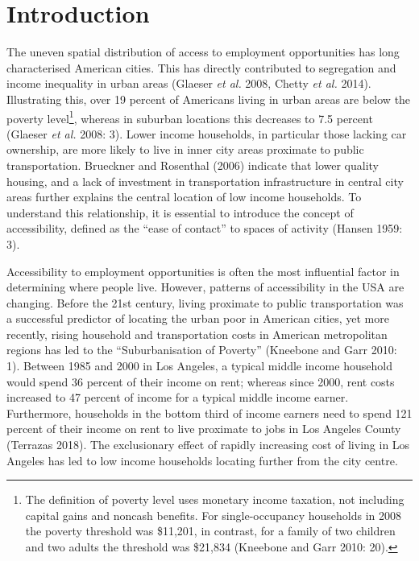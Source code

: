 \documentclass[a4paper,UKenglish]{lipics-v2018}
\begin{document}
\section{Introduction}
\doublespacing 
\normalsize
The uneven spatial distribution of access to employment opportunities has long characterised American cities. This has directly contributed to segregation and income inequality in urban areas (Glaeser \textit{et al.} 2008, Chetty \textit{et al.} 2014). Illustrating this, over 19 percent of Americans living in urban areas are below the poverty level\footnote{The definition of poverty level uses monetary income taxation, not including capital gains and noncash benefits. For single-occupancy households in 2008 the poverty threshold was \$11,201, in contrast, for a family of two children and two adults the threshold was \$21,834 (Kneebone and Garr 2010: 20).}, whereas in suburban locations this decreases to 7.5 percent (Glaeser \textit{et al.} 2008: 3). Lower income households, in particular those lacking car ownership, are more likely to live in inner city areas proximate to public transportation. Brueckner and Rosenthal (2006) indicate that lower quality housing, and a lack of investment in transportation infrastructure in central city areas further explains the central location of low income households. To understand this relationship, it is essential to introduce the concept of accessibility, defined as the “ease of contact” to spaces of activity (Hansen 1959: 3).

Accessibility to employment opportunities is often the most influential factor in determining where people live. However, patterns of accessibility in the USA are changing. Before the 21st century, living proximate to public transportation was a successful predictor of locating the urban poor in American cities, yet more recently, rising household and transportation costs in American metropolitan regions has led to the “Suburbanisation of Poverty” (Kneebone and Garr 2010: 1). Between 1985 and 2000 in Los Angeles, a typical middle income household would spend 36 percent of their income on rent; whereas since 2000, rent costs increased to 47 percent of income for a typical middle income earner. Furthermore, households in the bottom third of income earners need to spend 121 percent of their income on rent to live proximate to jobs in Los Angeles County (Terrazas 2018). The exclusionary effect of rapidly increasing cost of living in Los Angeles has led to low income households locating further from the city centre.
\end{document}
